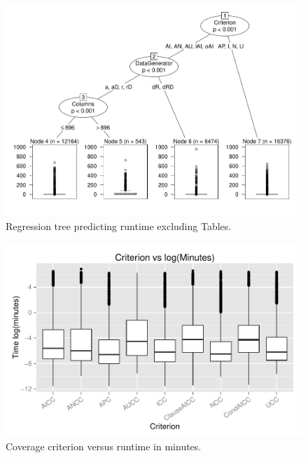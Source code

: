 \begin{figure}
\centering
  \centering
  \includegraphics[width=.75\linewidth]{diagrams/NoTableCtreesd.pdf}
  \caption{Regression tree predicting runtime excluding Tables.\vspace{-.15in}}
  \label{fig:ttree}
  \vspace{-.15in} 
\end{figure}


\begin{figure}
\centering
  \centering
  \includegraphics[width=1\linewidth]{diagrams/CriterionvsTime.pdf}
  \caption{Coverage criterion versus runtime in minutes.\vspace{-.15in}}
  \label{fig:crites}
  \vspace{-.15in} 
\end{figure}

